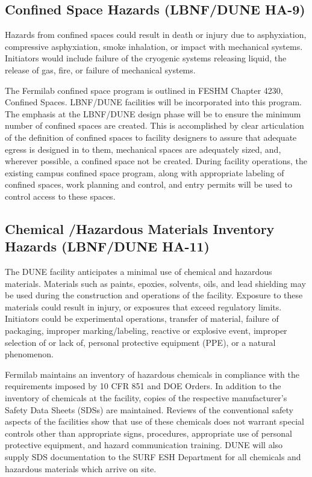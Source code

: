 \subsection{Confined Space Hazards (LBNF/DUNE HA-9)}

Hazards from confined spaces could result in death or injury due to
asphyxiation, compressive asphyxiation, smoke inhalation, or impact
with mechanical systems. Initiators would include failure of the
cryogenic systems releasing liquid, the release of gas, fire, or
failure of mechanical systems.

The Fermilab confined space program is outlined in FESHM Chapter 4230,
Confined Spaces. LBNF/DUNE facilities will be incorporated into this
program. The emphasis at the LBNF/DUNE design phase will be to ensure
the minimum number of confined spaces are created. This is
accomplished by clear articulation of the definition of confined
spaces to facility designers to assure that adequate egress is
designed in to them, mechanical spaces are adequately sized, and,
wherever possible, a confined space not be created. During facility
operations, the existing campus confined space program, along with
appropriate labeling of confined spaces, work planning and control,
and entry permits will be used to control access to these spaces.


\subsection{Chemical /Hazardous Materials Inventory Hazards (LBNF/DUNE HA-11)}

The DUNE facility anticipates a minimal use of chemical and hazardous
materials. Materials such as paints, epoxies, solvents, oils, and lead
shielding may be used during the construction and operations of the
facility. Exposure to these materials could result in injury, or
exposures that exceed regulatory limits. Initiators could be
experimental operations, transfer of material, failure of packaging,
improper marking/labeling, reactive or explosive event, improper
selection of or lack of, personal protective equipment (PPE), or a
natural phenomenon.

Fermilab maintains an inventory of hazardous chemicals in compliance
with the requirements imposed by 10 CFR 851 and DOE Orders. In
addition to the inventory of chemicals at the facility, copies of the
respective manufacturer’s Safety Data Sheets (SDSs) are
maintained. Reviews of the conventional safety aspects of the
facilities show that use of these chemicals does not warrant special
controls other than appropriate signs, procedures, appropriate use of
personal protective equipment, and hazard communication training. DUNE
will also supply SDS documentation to the SURF ESH Department for all
chemicals and hazardous materials which arrive on site.

